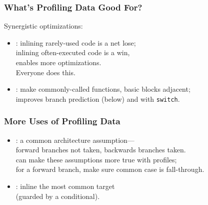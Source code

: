 \begin{frame}
  \frametitle{What's Profiling Data Good For?}
  
Synergistic optimizations:
\begin{itemize}
\item {}: inlining rarely-used code is a net lose; \\
inlining often-executed code is a win, \\
\qquad enables more optimizations.\\[1em]
Everyone does this.\\[1em]

\item {}: make commonly-called functions, basic blocks adjacent;\\
improves branch prediction (below) and with {\tt switch}.

\end{itemize}


  

\end{frame}


\begin{frame}
  \frametitle{More Uses of Profiling Data}
  

\begin{itemize}
\item {}: a common architecture assumption---\\
\qquad forward branches not taken, backwards branches taken.\\
can make these assumptions more true with profiles;\\
for a forward branch, make sure common case is fall-through.\\[1em]

\item {}: inline the most common target \\ \qquad (guarded by a conditional).
\end{itemize}
  

\end{frame}

